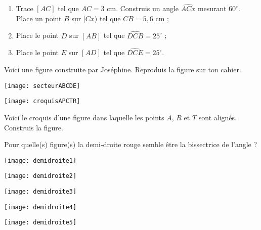 \begin{exercice}
\begin{enumerate}
\item Trace $[AC]$ tel que $AC = 3$ cm. Construis un angle $\widehat{ACx}$ mesurant $60^\circ$. Place un point $B$ sur $[Cx)$ tel que $CB = 5,6$ cm ;
\item Place le point $D$ sur $[AB]$ tel que $\widehat{DCB} = 25^\circ$ ;
\item Place le point $E$ sur $[AD]$ tel que $\widehat{DCE} = 25^\circ$.
\end{enumerate}
\end{exercice} 


\begin{exercice}
Voici une figure construite par Joséphine. Reproduis la figure sur ton cahier.
 \begin{center} \texttt{[image: secteurABCDE]} \end{center}
\end{exercice} 


\begin{exercice}
 \begin{center} \texttt{[image: croquisAPCTR]} \end{center}
 Voici le croquis d’une figure dans laquelle les points $A$, $R$ et $T$ sont alignés. Construis la figure.
\end{exercice} 


\columnbreak




\begin{exercice}[Reconnaître]
Pour quelle(s) figure(s) la demi‑droite rouge semble être la bissectrice de l'angle ?
\begin{colenumerate}{3}
 \item  
 
 \texttt{[image: demidroite1]}
 \item 
 
 \texttt{[image: demidroite2]}
 \item 
 
 \texttt{[image: demidroite3]}
 \item 
 
 \texttt{[image: demidroite4]}
 \item
 
 \texttt{[image: demidroite5]}

 \end{colenumerate}
\end{exercice} 


